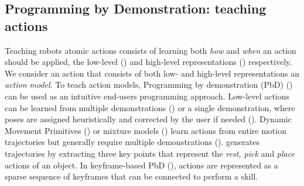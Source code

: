 \subsection{Programming by Demonstration: teaching actions}
Teaching robots atomic actions consists of learning both \textit{how} and \textit{when} an action should be applied, \ie the low-level () and high-level representations () respectively.
We consider an action that consists of both low- and high-level representations an \textit{action model}.
To teach action models, Programming by demonstration (PbD) () can be used as an intuitive end-users programming approach.
Low-level actions can be learned from multiple demonstrations (\cite{niekum2012learning}) or a single demonstration, where poses are assigned heuristically and corrected by the user if needed (\cite{alexandrova2014robot}).
Dynamic Movement Primitives (\cite{pastor2009learning}) or mixture models (\cite{calinon2007incremental}) learn actions from entire motion trajectories but generally require multiple demonstrations (\cite{abdo2013learning}).
\cite{ahmadzadeh2013visuospatial} generates trajectories by extracting three key points that represent the \textit{rest, pick} and \textit{place} actions of an object.
In keyframe-based PbD (\cite{akgun2012keyframe,alexandrova2014robot}), actions are represented as a sparse sequence of keyframes that can be connected to perform a skill.

